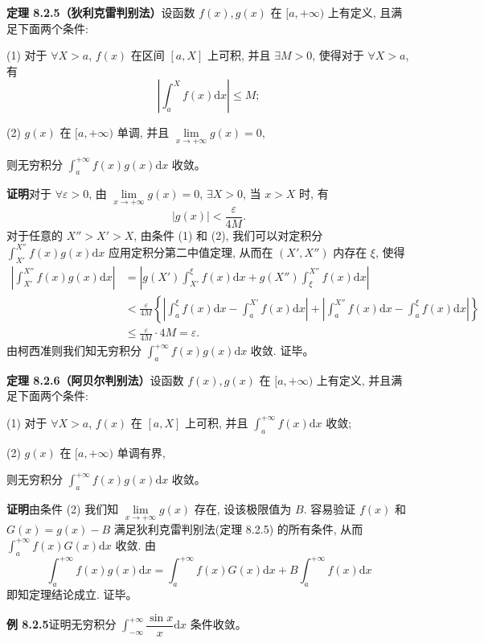 \documentclass[UTF8, 12pt, fontset=fandol, oneside]{ctexart}
\begin{document}
\noindent\textbf{定理 8.2.5（狄利克雷判别法）}\quad 设函数 $f(x),g(x)$ 在 $[a,+\infty)$ 上有定义, 且满足下面两个条件:

(1) 对于 $\forall X>a$, $f(x)$ 在区间 $[a,X]$ 上可积, 并且 $\exists M>0$, 使得对于 $\forall X>a$, 有
\[
  \left|\int_a^X f(x)\mathrm dx\right|\leq M;
\]

(2) $g(x)$ 在 $[a,+\infty)$ 单调, 并且 $\lim\limits_{x\to+\infty}g(x)=0$,

则无穷积分 $\int_a^{+\infty}f(x)g(x)\mathrm dx$ 收敛。

\noindent\textbf{证明}\quad 对于 $\forall\varepsilon>0$, 由 $\lim\limits_{x\to+\infty}g(x)=0$, $\exists X>0$, 当 $x>X$ 时, 有
\[
  |g(x)|<\frac{\varepsilon}{4M}.
\]
对于任意的 $X''>X'>X$, 由条件 (1) 和 (2), 我们可以对定积分 $\int_{X'}^{X''}f(x)g(x)\mathrm dx$ 应用定积分第二中值定理, 从而在 $(X',X'')$ 内存在 $\xi$, 使得
\[
\begin{aligned}
  \left|\int_{X'}^{X''}f(x)g(x)\mathrm dx\right|
  &=
  \left|g(X')\int_{X'}^\xi f(x)\mathrm dx
  +
  g(X'')\int_\xi^{X''}f(x)\mathrm dx\right|\\
  &<
  \frac{\varepsilon}{4M}
  \left\{
  \left|\int_a^\xi f(x)\mathrm dx-\int_a^{X'}f(x)\mathrm dx\right|
  +
  \left|\int_a^{X''}f(x)\mathrm dx-\int_a^\xi f(x)\mathrm dx\right|
  \right\}\\
  &\leq \frac{\varepsilon}{4M}\cdot4M=\varepsilon.
\end{aligned}
\]
由柯西准则我们知无穷积分 $\int_a^{+\infty}f(x)g(x)\mathrm dx$ 收敛. 证毕。

\noindent\textbf{定理 8.2.6（阿贝尔判别法）}\quad 设函数 $f(x),g(x)$ 在 $[a,+\infty)$ 上有定义, 并且满足下面两个条件:

(1) 对于 $\forall X>a$, $f(x)$ 在 $[a,X]$ 上可积, 并且 $\int_a^{+\infty}f(x)\mathrm dx$ 收敛;

(2) $g(x)$ 在 $[a,+\infty)$ 单调有界,

则无穷积分 $\int_a^{+\infty}f(x)g(x)\mathrm dx$ 收敛。

\noindent\textbf{证明}\quad 由条件 (2) 我们知 $\lim\limits_{x\to+\infty}g(x)$ 存在, 设该极限值为 $B$. 容易验证 $f(x)$ 和 $G(x)=g(x)-B$ 满足狄利克雷判别法(定理 8.2.5) 的所有条件, 从而 $\int_a^{+\infty}f(x)G(x)\mathrm dx$ 收敛. 由
\[
  \int_a^{+\infty}f(x)g(x)\mathrm dx
  =
  \int_a^{+\infty}f(x)G(x)\mathrm dx
  +
  B\int_a^{+\infty}f(x)\mathrm dx
\]
即知定理结论成立. 证毕。

\noindent\textbf{例 8.2.5}\quad 证明无穷积分 $\int_{-\infty}^{+\infty}\dfrac{\sin x}{x}\mathrm dx$ 条件收敛。
\end{document}
